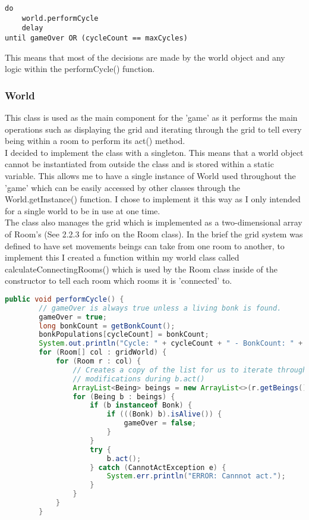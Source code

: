 \documentclass[12pt]{article}
\begin{document}
\begin{lstlisting}[caption=Game loop]
do
	world.performCycle
	delay
until gameOver OR (cycleCount == maxCycles)
\end{lstlisting}

This means that most of the decisions are made by the world object and any logic within the performCycle() function.

\subsubsection{World}
This class is used as the main component for the 'game' as it performs the main operations such as displaying the grid and iterating through the grid to tell every being within a room to perform its act() method. \\

I decided to implement the class with a singleton. This means that a world object cannot be instantiated from outside the class and is stored within a static variable. This allows me to have a single instance of World used throughout the 'game' which can be easily accessed by other classes through the World.getInstance() function. I chose  to implement it this way as I only intended for a single world to be in use at one time.\\

The class also manages the grid which is implemented as a two-dimensional array of Room's (See 2.2.3 for info on the Room class). In the brief the grid system was defined to have set movements beings can take from one room to another, to implement this I created a function within my world class called calculateConnectingRooms() which is used by the Room class inside of the constructor to tell each room which rooms it is 'connected' to.

\begin{lstlisting}[language=Java, basicstyle=\small, caption=performCycle function]
    public void performCycle() {
        // gameOver is always true unless a living bonk is found.
        gameOver = true;
        long bonkCount = getBonkCount();
        bonkPopulations[cycleCount] = bonkCount;
        System.out.println("Cycle: " + cycleCount + " - BonkCount: " + bonkCount);
        for (Room[] col : gridWorld) {
            for (Room r : col) {
                // Creates a copy of the list for us to iterate through despite
                // modifications during b.act()
                ArrayList<Being> beings = new ArrayList<>(r.getBeings());
                for (Being b : beings) {
                    if (b instanceof Bonk) {
                        if (((Bonk) b).isAlive()) {
                            gameOver = false;
                        }
                    }
                    try {
                        b.act();
                    } catch (CannotActException e) {
                        System.err.println("ERROR: Cannnot act.");
                    }
                }
            }
        }
\end{lstlisting}
\end{document}
